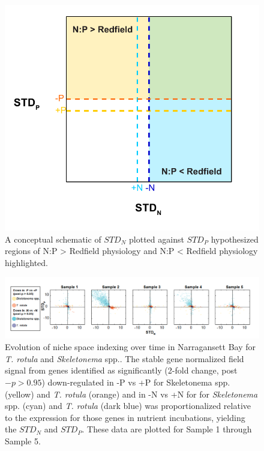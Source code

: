 
\begin{figure}[p!]
  \centering
    \includegraphics[width=1\textwidth]{Images/C3_SFigure8_Schematic_Quadrants.pdf}
    \caption[Conceptual schemiatic of $STD_N$ plotted against $STD_P$]{A conceptual schematic of $STD_N$ plotted against $STD_P$ hypothesized regions of N:P > Redfield physiology and N:P < Redfield physiology highlighted.}
  \label{fig:a3f8}
\end{figure}


\begin{landscape}
   \centering
   \null         %
   \vfill        %

	\begin{figure}
  	\centering
    	\includegraphics[width=1.3\textwidth]{Images/C3_SFigure9_NISP_DNGenes.png}
    	\caption[Evolution of niche space indexing over for significantly down-regualted genes]{Evolution of niche space indexing over time in Narragansett Bay for \textit{T. rotula} and \textit{Skeletonema} spp.. The stable gene normalized field signal from genes identified as significantly (2-fold change, post$-p > 0.95$) down-regulated in -P vs +P for Skeletonema spp. (yellow) and \textit{T. rotula} (orange) and in -N vs +N for for \textit{Skeletonema} spp. (cyan) and \textit{T. rotula} (dark blue) was proportionalized relative to the expression for those genes in nutrient incubations, yielding the $STD_N$ and $STD_P$. These data are plotted for Sample 1 through Sample 5.}
  	\label{fig:a3f9}
	\end{figure}
    \vfill        %
\end{landscape}

